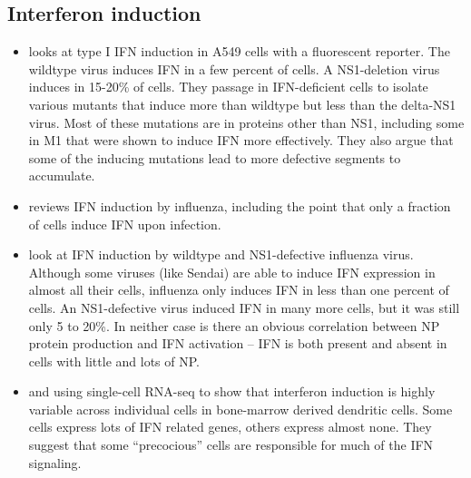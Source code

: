 \documentclass[9pt,lineno]{elife}
\begin{document}
\subsection{Interferon induction}
\begin{itemize}

\item \citet{perez2014unbiased} looks at type I IFN induction in A549 cells with a fluorescent reporter.
The wildtype virus induces IFN in a few percent of cells.
A NS1-deletion virus induces in 15-20\% of cells.
They passage in IFN-deficient cells to isolate various mutants that induce more than wildtype but less than the delta-NS1 virus.
Most of these mutations are in proteins other than NS1, including some in M1 that were shown to induce IFN more effectively.
They also argue that some of the inducing mutations lead to more defective segments to accumulate.

\item \citet{killip2015influenza} reviews IFN induction by influenza, including the point that only a fraction of cells induce IFN upon infection.

\item \citet{killip2017single} look at IFN induction by wildtype and NS1-defective influenza virus.
Although some viruses (like Sendai) are able to induce IFN expression in almost all their cells, influenza only induces IFN in less than one percent of cells.
An NS1-defective virus induced IFN in many more cells, but it was still only 5 to 20\%.
In neither case is there an obvious correlation between NP protein production and IFN activation -- IFN is both present and absent in cells with little and lots of NP.

\item \citet{shalek2013single} and \citet{shalek2014single} using single-cell RNA-seq to show that interferon induction is highly variable across individual cells in bone-marrow derived dendritic cells.
Some cells express lots of IFN related genes, others express almost none.
They suggest that some ``precocious'' cells are responsible for much of the IFN signaling.


\end{itemize}
\end{document}
